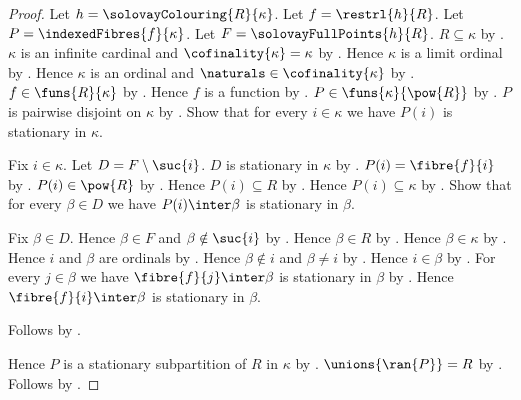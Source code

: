 \begin{proof}
    Let $h=\solovayColouring{R}{\kappa}$.
    Let $f=\restrl{h}{R}$.
    Let $P=\indexedFibres{f}{\kappa}$.
    Let $F=\solovayFullPoints{h}{R}$.
    $R\subseteq\kappa$ by .
    $\kappa$ is an infinite cardinal and $\cofinality{\kappa}=\kappa$
        by .
    Hence $\kappa$ is a limit ordinal
        by .
    Hence $\kappa$ is an ordinal and $\naturals\in\cofinality{\kappa}$
        by .
    $f\in\funs{R}{\kappa}$ by .
    Hence $f$ is a function by .
    $P\in\funs{\kappa}{\pow{R}}$ by .
    $P$ is pairwise disjoint on $\kappa$
        by .
    Show that for every $i\in\kappa$ we have
        $P(i)$ is stationary in $\kappa$.
    \begin{subproof}
        Fix $i\in\kappa$.
        Let $D=F\setminus\suc{i}$.
        $D$ is stationary in $\kappa$ by .
        $P(i)=\fibre{f}{i}$ by .
        $P(i)\in\pow{R}$ by .
        Hence $P(i)\subseteq R$ by .
        Hence $P(i)\subseteq\kappa$ by .
        Show that for every $\beta\in D$ we have
            $P(i)\inter\beta$ is stationary in $\beta$.
        \begin{subproof}
            Fix $\beta\in D$.
            Hence $\beta\in F$ and $\beta\notin\suc{i}$
                by .
            Hence $\beta\in R$ by .
            Hence $\beta\in\kappa$ by .
            Hence $i$ and $\beta$ are ordinals
                by .
            Hence $\beta\notin i$ and $\beta\neq i$ by .
            Hence $i\in\beta$ by .
            For every $j\in\beta$ we have
                $\fibre{f}{j}\inter\beta$ is stationary in $\beta$
                by .
            Hence $\fibre{f}{i}\inter\beta$ is stationary in $\beta$.
        \end{subproof}
        Follows by .
    \end{subproof}
    Hence $P$ is a stationary subpartition of $R$ in $\kappa$
        by .
    $\unions{\ran{P}}=R$ by .
    Follows by .
\end{proof}

